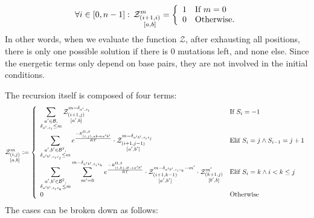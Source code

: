 \begin{equation}
	\forall i \in [0,n-1]:\, \Z{i+1,i}{m}{a,b}=\left\{
	\begin{array}{ll}
		1 &\text{If } m = 0\\
		0 &\text{Otherwise.}
	\end{array}\right.
\label{eq:Z_in}
\end{equation}
In other words, when we evaluate the function $\mathcal Z$, after exhausting all positions, there 
is only one possible solution if there is $0$ mutations left, and none else. Since the 
energetic terms only depend on base pairs, they are not involved in the initial conditions. 

The recursion itself is composed of four terms:
\begin{equation}
	\Z{i,j}{m}{a,b}:=\left\{
  \begin{array}{ll}
  		\displaystyle
      \sum_{\substack{a'\in \B,\\ \Kron_{a',s_i}\le m}}  
      \Z{i+1,j}{m-\Kron_{a',s_i}}{a',b} & \text{If }S_{i}=-1\\
      \displaystyle
      \sum_{\substack{a',b'\in \B^2,\\ \Kron_{a'b',s_is_j}\le m}}
			 e^{\frac{-E_{(i,j),ab \to a'b'}^{\Omega,\beta}}{RT}}
			 \cdot \Z{i+1,j-1}{m-\Kron_{a'b',s_is_j}}{a',b'}&
			 \text{Elif }S_i=j \land S_{i-1}=j+1\\
			 \displaystyle
      \sum_{\substack{a',b'\in \B^2,\\ \Kron_{a'b',s_is_k}\le m}}
      \sum_{m'=0}^{m-\Kron_{a'b',s_is_k}}
   		 e^{\frac{-E_{(i,k),\varnothing\to a'b'}^{\Omega,\beta}}{RT}}
      \cdot\Z{i+1,k-1}{m-\Kron_{a'b',s_is_k}-m'}{a',b'}
      \cdot\Z{k+1,j}{m'}{b',b} & \text{Elif }S_i=k \land i < k \leq j\\
      0 &\text{Otherwise}
	\end{array}\right.
\label{eq:Z_rec}
\end{equation}
The cases can be broken down as follows:

